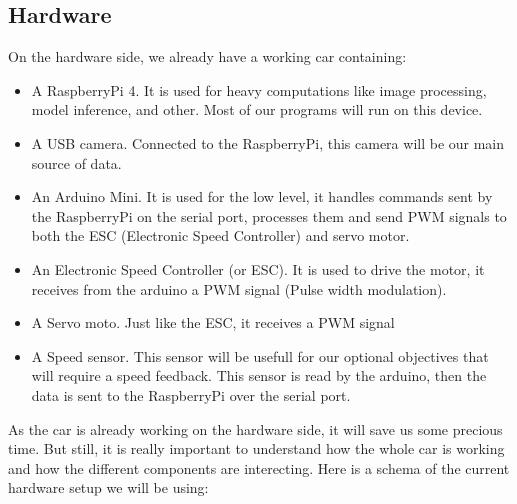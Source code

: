 \documentclass[12pt]{article}
\begin{document}
\subsection{Hardware}
On the hardware side, we already have a working car containing:
\begin{itemize}
\item A RaspberryPi 4. It is used for heavy computations like image processing, model inference, and other. Most of our programs will run on this device.
\item A USB camera. Connected to the RaspberryPi, this camera will be our main source of data.
\item An Arduino Mini. It is used for the low level, it handles commands sent by the RaspberryPi on the serial port, processes them and send PWM signals to both the ESC (Electronic Speed Controller) and servo motor.
\item An Electronic Speed Controller (or ESC). It is used to drive the motor, it receives  from the arduino a PWM signal (Pulse width modulation).
\item A Servo moto. Just like the ESC, it receives a PWM signal
\item A Speed sensor. This sensor will be usefull for our optional objectives that will require a speed feedback. This sensor is read by the arduino, then the data is sent to the RaspberryPi over the serial port.
\end{itemize}

As the car is already working on the hardware side, it will save us some precious time. But still, it is really important to understand how the whole car is working and how the different components are interecting.
Here is a schema of the current hardware setup we will be using:
\newpage

\end{document}

